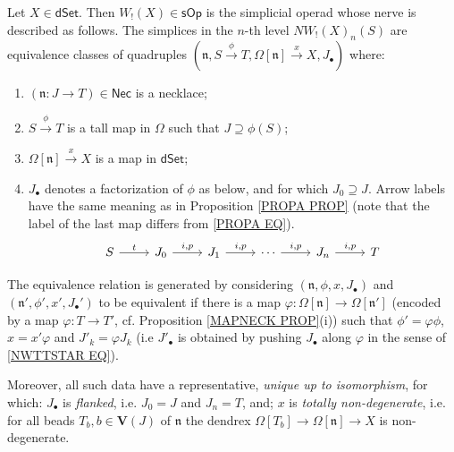 \documentclass{hha}
\theoremstyle{definition} %
\newcommand{\sOp}{\mathsf{sOp}}
\begin{document}
\begin{theorem}
	\label{THMB}
	Let $X\in \mathsf{dSet}$.
	Then $W_!(X) \in \sOp$ is the simplicial operad whose 
	nerve is described as follows.
	The simplices in the $n$-th level
	$NW_!(X)_{n}(S)$
	are equivalence classes of quadruples
	$(\mathfrak{n}, S \xrightarrow{\phi} T, \Omega[\mathfrak{n}] \xrightarrow{x} X, J_{\bullet})$ 
	where:
        \begin{enumerate}[label=(\roman*)]
	\item $(\mathfrak{n}\colon J \to T) \in \mathsf{Nec}$ is a necklace; 
	\item $S \xrightarrow{\phi} T$
		is a tall map in $\Omega$
		such that $J \supseteq \phi(S)$;		
	\item $\Omega[ \mathfrak{n}] \xrightarrow{x} X$ is a map in $\mathsf{dSet}$;
	\item $J_{\bullet}$ denotes a 
		factorization of $\phi$ as below,
		and for which $J_0 \supseteq J$.
		Arrow labels have the same meaning as in 
		Proposition \ref{PROPA PROP}
		(note that the label of the last map differs from
		\eqref{PROPA EQ}).
                \begin{equation}
                        \begin{tikzcd}
                                S \ar{r}{t}
                                &
                                J_0 \ar{r}{i,p}
                                &
                                J_1 \ar{r}{i,p}
                                &
                                \cdots
                                \ar{r}{i,p}
                                &
                                J_n \ar{r}{i,p}
                                &
                                T
                        \end{tikzcd}
                \end{equation}
        \end{enumerate}
	The equivalence relation is generated by considering 
	$(\mathfrak{n},\phi,x,J_{\bullet})$ and
	$(\mathfrak{n}',\phi',x',J_{\bullet}')$
	to be equivalent if there is
	a map
	$\varphi \colon \Omega[\mathfrak{n}] \to \Omega[\mathfrak{n}']$
	(encoded by a map $\varphi \colon T \to T'$,
        cf. Proposition \ref{MAPNECK PROP}(i))
	such that
	$\phi' = \varphi \phi$,
	$x = x' \varphi $
	and
	$J'_k = \varphi J_k$
	(i.e $J'_{\bullet}$
	is obtained by pushing 
	$J_{\bullet}$ along $\varphi$
	in the sense of \eqref{NWTTSTAR EQ}).
	
	Moreover, all such data have a representative, 
	\emph{unique up to isomorphism},
	for which:
	$J_{\bullet}$ is \emph{flanked},
	i.e. $J_0=J$ and $J_n=T$,
	and;
	$x$ is \emph{totally non-degenerate},
	i.e. for all beads 
	$T_b, b \in \boldsymbol{V}(J)$ of 
	$\mathfrak{n}$
	the dendrex
	$\Omega[T_b] \to \Omega[\mathfrak{n}] \to X$
	is non-degenerate. 
\end{theorem}
\end{document}
